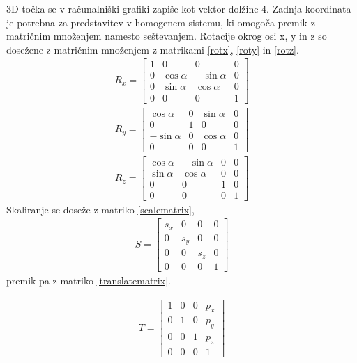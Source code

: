 \documentclass[a4paper, 12pt]{book}
\begin{document}
3D točka se v računalniški grafiki zapiše kot vektor dolžine 4. Zadnja koordinata je potrebna za predstavitev v homogenem sistemu, ki omogoča premik z matričnim množenjem namesto seštevanjem. Rotacije okrog osi x, y in z so dosežene z matričnim množenjem z matrikami \ref{rotx}, \ref{roty} in \ref{rotz}.
\begin{align}
R_x
=
\begin{bmatrix}
1 & 0 & 0 & 0 \\
0 & \cos\alpha & -\sin\alpha & 0 \\
0 & \sin\alpha & \cos\alpha & 0 \\
0 & 0 & 0 & 1
\end{bmatrix}
\label{rotx}
\end{align}
\begin{align}
R_y
=
\begin{bmatrix}
\cos\alpha & 0 & \sin\alpha & 0 \\
0 & 1 & 0 & 0 \\
-\sin\alpha & 0 & \cos\alpha & 0 \\
0 & 0 & 0 & 1
\end{bmatrix}
\label{roty}
\end{align}
\begin{align}
R_z
=
\begin{bmatrix}
\cos\alpha & -\sin\alpha & 0 & 0 \\
\sin\alpha & \cos\alpha & 0 & 0 \\
0 & 0 & 1 & 0 \\
0 & 0 & 0 & 1
\end{bmatrix}
\label{rotz}
\end{align}
Skaliranje se doseže z matriko \ref{scalematrix},
\begin{align}
S
=
\begin{bmatrix}
s_x & 0 & 0 & 0 \\
0 & s_y & 0 & 0 \\
0 & 0 & s_z & 0 \\
0 & 0 & 0 & 1
\end{bmatrix}
\label{scalematrix}
\end{align}
premik pa z matriko \ref{translatematrix}.

\begin{align}
T
=
\begin{bmatrix}
1 & 0 & 0 & p_x \\
0 & 1 & 0 & p_y \\
0 & 0 & 1 & p_z \\
0 & 0 & 0 & 1
\end{bmatrix}
\label{translatematrix}
\end{align}
\end{document}
